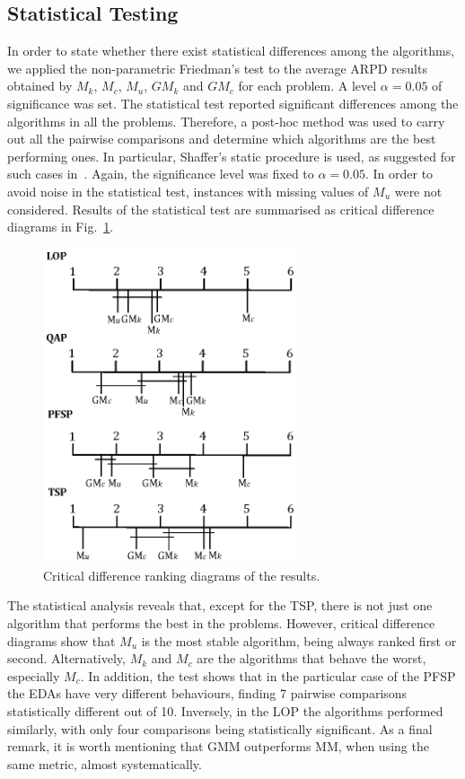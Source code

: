 \documentclass[conference]{IEEEtran}
\begin{document}
\subsection{Statistical Testing}
In order to state whether there exist statistical differences among the algorithms, we applied the non-parametric Friedman's test to the average ARPD results obtained by $M_k$, $M_c$, $M_u$, $GM_k$ and $GM_c$ for each problem. A level $\alpha=0.05$ of significance was set. The statistical test reported significant differences among the algorithms in all the problems. Therefore, a post-hoc method was used to carry out all the pairwise comparisons and determine which algorithms are the best performing ones. In particular, Shaffer's static procedure is used, as suggested for such cases in~\cite{garcia09}. Again, the significance level was fixed to $\alpha=0.05$. In order to avoid noise in the statistical test, instances with missing values of $M_u$ were not considered. Results of the statistical test are summarised as critical difference diagrams in Fig.~\ref{fig:criticaldifferences}.
\begin{figure}[!hbt]
\begin{center}
\includegraphics[width=7.5cm]{figures/critical_differences}
\end{center}
\caption{Critical difference ranking diagrams of the results.} 
\label{fig:criticaldifferences}
\end{figure}

The statistical analysis reveals that, except for the TSP, there is not just one algorithm that performs the best in the problems. However, critical difference diagrams show that $M_u$ is the most stable algorithm, being always ranked first or second. Alternatively, $M_k$ and $M_c$ are the algorithms that behave the worst, especially $M_c$.
In addition, the test shows that in the particular case of the PFSP the EDAs have very different behaviours, finding 7 pairwise comparisons statistically different out of 10. Inversely, in the LOP the algorithms performed similarly, with only four comparisons being statistically significant. As a final remark, it is worth mentioning that GMM outperforms MM, when using the same metric, almost systematically.
\end{document}
